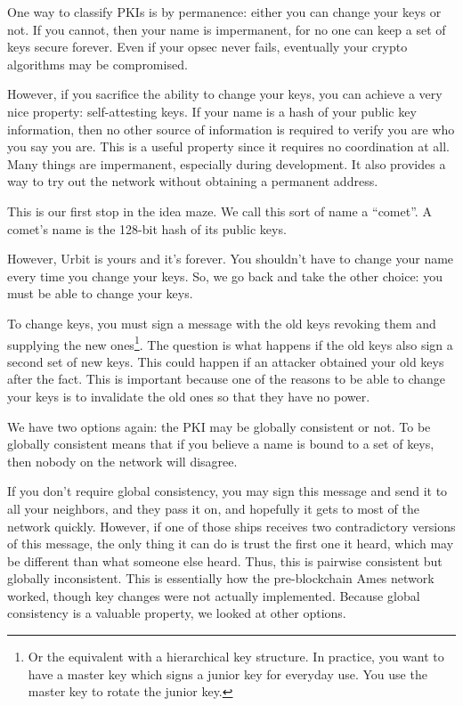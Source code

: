 \documentclass[twoside]{article}
\begin{document}
One way to classify PKIs is by permanence: either you can change your keys or not. If
you cannot, then your name is impermanent, for no one can keep a set of
keys secure forever. Even if your opsec never fails, eventually your
crypto algorithms may be compromised.

However, if you sacrifice the ability to change your keys, you can achieve
a very nice property: self-attesting keys. If your name is a hash of
your public key information, then no other source of information is
required to verify you are who you say you are. This is a useful
property since it requires no coordination at all. Many things are
impermanent, especially during development. It also provides a way to
try out the network without obtaining a permanent address.

This is our first stop in the idea maze. We call this sort of name a
``comet''. A comet's name is the 128-bit hash of its public keys.

However, Urbit is yours and it's forever. You shouldn't have to change
your name every time you change your keys. So, we go back and take the
other choice: you must be able to change your keys.

To change keys, you must sign a message with the old keys revoking them
and supplying the new
ones\footnote{Or the equivalent with a hierarchical key structure. In practice, you
want to have a master key which signs a junior key for everyday use.
You use the master key to rotate the junior
key.}. The question is what
happens if the old keys also sign a second set of new keys. This could
happen if an attacker obtained your old keys after the fact. This is
important because one of the reasons to be able to change your keys is
to invalidate the old ones so that they have no power.

We have two options again: the PKI may be globally consistent or not. To
be globally consistent means that if you believe a name is bound to a
set of keys, then nobody on the network will disagree.

If you don't require global consistency, you may sign this message and
send it to all your neighbors, and they pass it on, and hopefully it
gets to most of the network quickly. However, if one of those ships
receives two contradictory versions of this message, the only thing it
can do is trust the first one it heard, which may be different than what
someone else heard. Thus, this is pairwise consistent but globally
inconsistent. This is essentially how the pre-blockchain Ames network
worked, though key changes were not actually implemented. Because global
consistency is a valuable property, we looked at other options.
\end{document}
